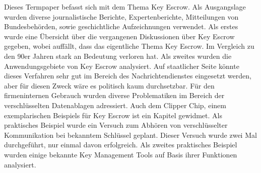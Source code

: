 Dieses Termpaper befasst sich mit dem Thema Key Escrow. Als Ausgangslage wurden diverse journalistische Berichte, Expertenberichte, Mitteilungen von Bundesbehörden, sowie geschichtliche Aufzeichnungen verwendet. Als erstes wurde eine Übersicht über die vergangenen Diskussionen über Key Escrow gegeben, wobei auffällt, dass das eigentliche Thema Key Escrow. Im Vergleich zu den 90er Jahren stark an Bedeutung verloren hat. Als zweites wurden die Anwendungsgebiete von Key Escrow analysiert. Auf staatlicher Seite könnte dieses Verfahren sehr gut im Bereich des Nachrichtendienstes eingesetzt werden, aber für diesen Zweck wäre es politisch kaum durchsetzbar. Für den firmeninternen Gebrauch wurden diverse Problematiken im Bereich der verschlüsselten Datenablagen adressiert. Auch dem Clipper Chip, einem exemplarischen Beispiels für Key Escrow ist ein Kapitel gewidmet. Als praktisches Beispiel wurde ein Versuch zum Abhören von verschlüsselter Kommunikation bei bekanntem Schlüssel geplant. Dieser Versuch wurde zwei Mal durchgeführt, nur einmal davon erfolgreich. Als zweites praktisches Beispiel wurden einige bekannte Key Management Tools auf Basis ihrer Funktionen analysiert.